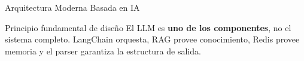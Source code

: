 \documentclass[aspectratio=169]{beamer}
\begin{document}
\begin{frame}{Arquitectura Moderna Basada en IA}
\begin{center}
\end{center}

\vspace{0.2em}
\begin{exampleblock}{Principio fundamental de diseño}
  El LLM es \textbf{uno de los componentes}, no el sistema completo.
  LangChain orquesta, RAG provee conocimiento, Redis provee memoria y
  el parser garantiza la estructura de salida.
\end{exampleblock}
\end{frame}

\end{document}
